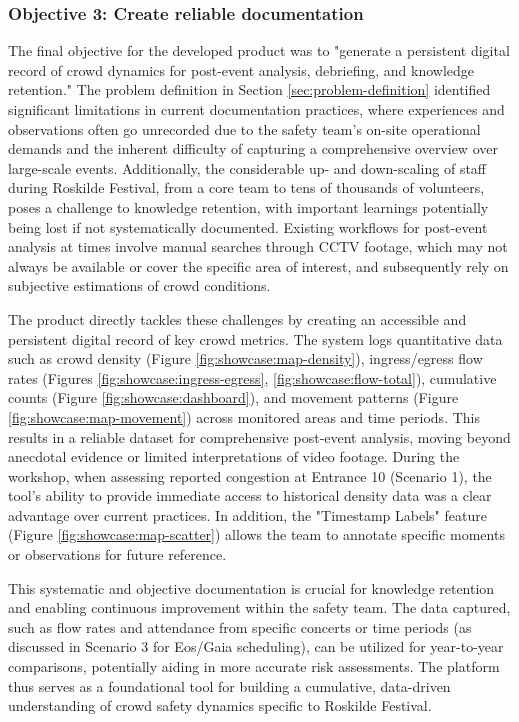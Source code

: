 \subsubsection{Objective 3: Create reliable documentation}

The final objective for the developed product was to "generate a persistent digital record of crowd dynamics for post-event analysis, debriefing, and knowledge retention." The problem definition in Section \ref{sec:problem-definition} identified significant limitations in current documentation practices, where experiences and observations often go unrecorded due to the safety team's on-site operational demands and the inherent difficulty of capturing a comprehensive overview over large-scale events. Additionally, the considerable up- and down-scaling of staff during Roskilde Festival, from a core team to tens of thousands of volunteers, poses a challenge to knowledge retention, with important learnings potentially being lost if not systematically documented. Existing workflows for post-event analysis at times involve manual searches through CCTV footage, which may not always be available or cover the specific area of interest, and subsequently rely on subjective estimations of crowd conditions.

The product directly tackles these challenges by creating an accessible and persistent digital record of key crowd metrics. The system logs quantitative data such as crowd density (Figure \ref{fig:showcase:map-density}), ingress/egress flow rates (Figures \ref{fig:showcase:ingress-egress}, \ref{fig:showcase:flow-total}), cumulative counts (Figure \ref{fig:showcase:dashboard}), and movement patterns (Figure \ref{fig:showcase:map-movement}) across monitored areas and time periods. This results in a reliable dataset for comprehensive post-event analysis, moving beyond anecdotal evidence or limited interpretations of video footage. During the workshop, when assessing reported congestion at Entrance 10 (Scenario 1), the tool's ability to provide immediate access to historical density data was a clear advantage over current practices. In addition, the "Timestamp Labels" feature (Figure \ref{fig:showcase:map-scatter}) allows the team to annotate specific moments or observations for future reference.

This systematic and objective documentation is crucial for knowledge retention and enabling continuous improvement within the safety team. The data captured, such as flow rates and attendance from specific concerts or time periods (as discussed in Scenario 3 for Eos/Gaia scheduling), can be utilized for year-to-year comparisons, potentially aiding in more accurate risk assessments. The platform thus serves as a foundational tool for building a cumulative, data-driven understanding of crowd safety dynamics specific to Roskilde Festival.


